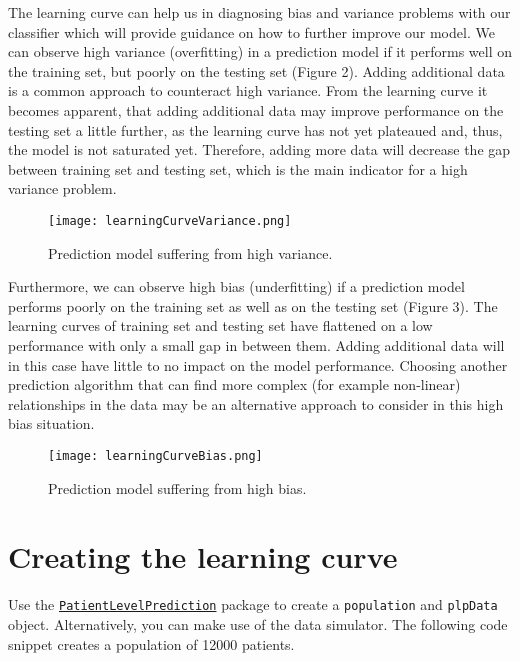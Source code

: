 \documentclass[
]{article}
\begin{document}
The learning curve can help us in diagnosing bias and variance problems
with our classifier which will provide guidance on how to further
improve our model. We can observe high variance (overfitting) in a
prediction model if it performs well on the training set, but poorly on
the testing set (Figure 2). Adding additional data is a common approach
to counteract high variance. From the learning curve it becomes
apparent, that adding additional data may improve performance on the
testing set a little further, as the learning curve has not yet
plateaued and, thus, the model is not saturated yet. Therefore, adding
more data will decrease the gap between training set and testing set,
which is the main indicator for a high variance problem.

\begin{figure}
\centering
\texttt{[image: learningCurveVariance.png]}
\caption{Prediction model suffering from high variance.}
\end{figure}

Furthermore, we can observe high bias (underfitting) if a prediction
model performs poorly on the training set as well as on the testing set
(Figure 3). The learning curves of training set and testing set have
flattened on a low performance with only a small gap in between them.
Adding additional data will in this case have little to no impact on the
model performance. Choosing another prediction algorithm that can find
more complex (for example non-linear) relationships in the data may be
an alternative approach to consider in this high bias situation.

\begin{figure}
\centering
\texttt{[image: learningCurveBias.png]}
\caption{Prediction model suffering from high bias.}
\end{figure}

\hypertarget{creating-the-learning-curve}{%
\section{Creating the learning
curve}\label{creating-the-learning-curve}}

Use the
\href{http://github.com/OHDSI/PatientLevelPrediction}{\texttt{PatientLevelPrediction}}
package to create a \texttt{population} and \texttt{plpData} object.
Alternatively, you can make use of the data simulator. The following
code snippet creates a population of 12000 patients.
\end{document}
